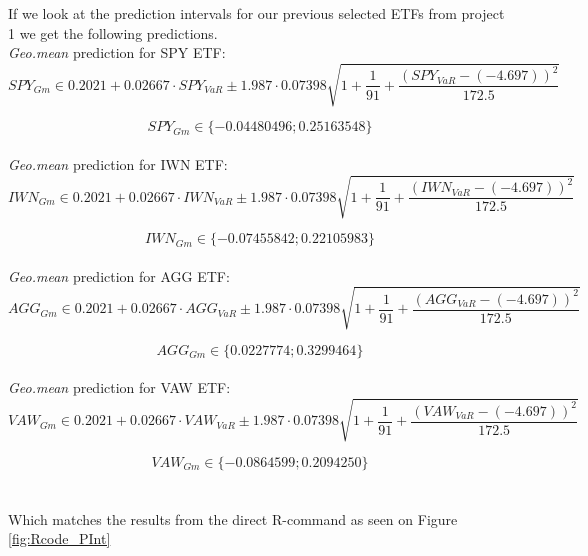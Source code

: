 \documentclass{article}
\begin{document}
If we look at the prediction intervals for our previous selected ETFs from project 1 we get the following predictions.\\

\textit{Geo.mean} prediction for SPY ETF:
    \begin{equation}
    {SPY}_{Gm} \in
    0.2021+0.02667\cdot SPY_{VaR} \pm
    1.987 \cdot 0.07398
    \sqrt{
    1+\frac{1}{91}+ \frac{(SPY_{VaR}-(-4.697))^2}{172.5}
    }
    \end{equation}
    
    \begin{equation}
    SPY_{Gm} \in \{ -0.04480496 ; 0.25163548 \}
    \end{equation}\\

\textit{Geo.mean} prediction for IWN ETF:
    \begin{equation}
    {IWN}_{Gm} \in
    0.2021+0.02667\cdot IWN_{VaR} \pm
    1.987 \cdot 0.07398
    \sqrt{
    1+\frac{1}{91}+ \frac{(IWN_{VaR}-(-4.697))^2}{172.5}
    }
    \end{equation}
    
    \begin{equation}
    IWN_{Gm} \in \{ -0.07455842 ; 0.22105983 \}
    \end{equation}\\

\textit{Geo.mean} prediction for AGG ETF:
    \begin{equation}
    {AGG}_{Gm} \in
    0.2021+0.02667\cdot AGG_{VaR} \pm
    1.987 \cdot 0.07398
    \sqrt{
    1+\frac{1}{91}+ \frac{(AGG_{VaR}-(-4.697))^2}{172.5}
    }
    \end{equation}
    
    \begin{equation}
    AGG_{Gm} \in \{ 0.0227774 ; 0.3299464 \}
    \end{equation}\\
    
\textit{Geo.mean} prediction for VAW ETF:
    \begin{equation}
    {VAW}_{Gm} \in
    0.2021+0.02667\cdot VAW_{VaR} \pm
    1.987 \cdot 0.07398
    \sqrt{
    1+\frac{1}{91}+ \frac{(VAW_{VaR}-(-4.697))^2}{172.5}
    }
    \end{equation}
    
    \begin{equation}
    VAW_{Gm} \in \{ -0.0864599 ; 0.2094250 \}
    \end{equation}\\
\\
Which matches the results from the direct R-command as seen on Figure \ref{fig:Rcode_PInt}
\end{document}
